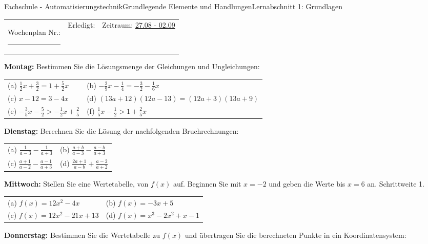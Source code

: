 \documentclass[oneside,openany,headings=optiontotoc,11pt,numbers=noenddot]{scrreprt}
\begin{document}
	\begin{worksheet}{Fachschule - Automatisierungstechnik}{Grundlegende Elemente und Handlungen}{Lernabschnitt 1: Grundlagen}
		\noindent
		\begin{tabularx}{\textwidth}{XXl}
			Wochenplan Nr.: \rule{0.15\textwidth}{1pt} & Erledigt: & Zeitraum: \underline{27.08 - 02.09}
		\end{tabularx}
	
		\begin{framed}
			\noindent
			\textbf{Montag:}  Bestimmen Sie die Lösungsmenge der Gleichungen und Ungleichungen:\\
			\begin{tabularx}{\textwidth}{XX}
				(a) \(\frac{1}{2}x + \frac{3}{2} = 1 + \frac{5}{2}x\) & (b) \(-\frac{2}{9}x - \frac{1}{4} = -\frac{3}{2}-\frac{1}{6}x\)\\
				(c) \(x-12 = 3-4x\) &	(d) \((13a+12)(12a-13) = (12a+3)(13a+9)\)\\
				(e) \(-\frac{3}{5}x-\frac{5}{2} > -\frac{1}{2}x + \frac{2}{5}\) & (f) \(\frac{1}{5}x-\frac{1}{2}>1+\frac{2}{5}x\)
			\end{tabularx}
		\end{framed}
		\begin{framed}
			\noindent
			\textbf{Dienstag:} Berechnen Sie die Lösung der nachfolgenden Bruchrechnungen:\\
			\begin{tabularx}{\textwidth}{XX}
				(a) \(\frac{1}{a-3} - \frac{1}{a+3}\) & (b) \(\frac{a+b}{a-3}-\frac{a-b}{a+3}\)\\
				(c) \(\frac{a+1}{a-2}- \frac{a-1}{a+3}\) & (d) \(\frac{2a+1}{a-b} + \frac{a-2}{a+2}\)
			\end{tabularx}
		\end{framed}
		\begin{framed}
			\noindent
			\textbf{Mittwoch:} Stellen Sie eine Wertetabelle, von \(f(x)\) auf. Beginnen Sie mit \(x = -2\) und geben die Werte bis \(x = 6\) an. Schrittweite 1.\\
			\begin{tabularx}{\textwidth}{XX}
				(a) \(f(x) = 12x^2 - 4x\) & (b) \(f(x) = -3x + 5\)\\
				(c) \(f(x) = 12x^2-21x+13\) & (d) \(f(x) = x^3 - 2x^2 + x - 1\)
			\end{tabularx}
		\end{framed}
		\begin{framed}
			\noindent
			\textbf{Donnerstag:} Bestimmen Sie die Wertetabelle zu \(f(x)\) und übertragen Sie die berechneten Punkte in ein Koordinatensystem:\\

\end{framed}
\end{worksheet}
\end{document}
